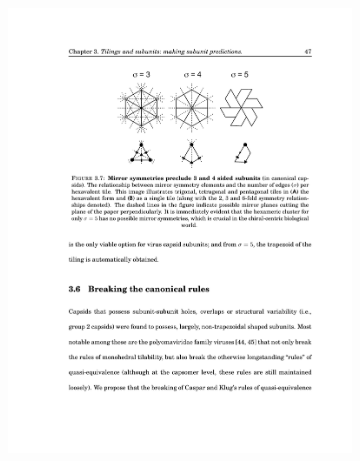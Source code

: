 \documentclass[12pt,letter]{article}
\begin{document}
\begin{figure}[h]
	\centering
	\caption{Protomer Options}
	\begin{subfigure}[h]{.2\textwidth}
		\includegraphics[width=\textwidth]{sigma3.pdf}
		\caption{}
		\label{fig:sigma3}
	\end{subfigure}
	~
	\begin{subfigure}[h]{.2\textwidth}

\end{subfigure}
\end{figure}
\end{document}
